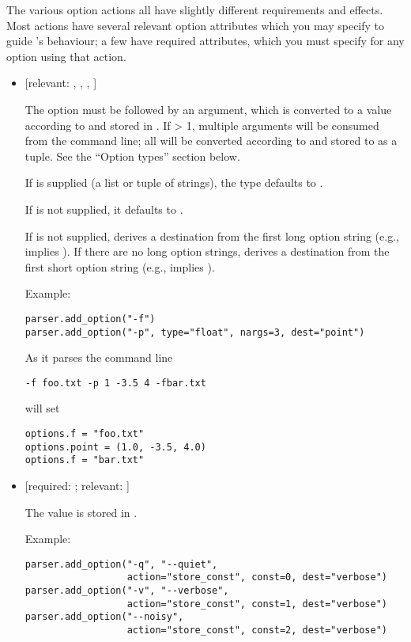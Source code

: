 The various option actions all have slightly different requirements and
effects.  Most actions have several relevant option attributes which you
may specify to guide 's behaviour; a few have required attributes,
which you must specify for any option using that action.
\begin{itemize}
\item {} 
 {[}relevant: , , , ]

The option must be followed by an argument, which is
converted to a value according to  and stored in
.  If  {\textgreater} 1, multiple arguments will be consumed
from the command line; all will be converted according to
 and stored to  as a tuple.  See the ``Option
types'' section below.

If  is supplied (a list or tuple of strings), the type
defaults to .

If  is not supplied, it defaults to .

If  is not supplied,  derives a destination from the
first long option string (e.g.,  implies ).
If there are no long option strings,  derives a destination from
the first short option string (e.g.,  implies ).

Example:
\begin{verbatim}
parser.add_option("-f")
parser.add_option("-p", type="float", nargs=3, dest="point")
\end{verbatim}

As it parses the command line
\begin{verbatim}
-f foo.txt -p 1 -3.5 4 -fbar.txt
\end{verbatim}

 will set
\begin{verbatim}
options.f = "foo.txt"
options.point = (1.0, -3.5, 4.0)
options.f = "bar.txt"
\end{verbatim}

\item {} 
 {[}required: ; relevant: ]

The value  is stored in .

Example:
\begin{verbatim}
parser.add_option("-q", "--quiet",
                  action="store_const", const=0, dest="verbose")
parser.add_option("-v", "--verbose",
                  action="store_const", const=1, dest="verbose")
parser.add_option("--noisy",
                  action="store_const", const=2, dest="verbose")
\end{verbatim}


\end{itemize}
